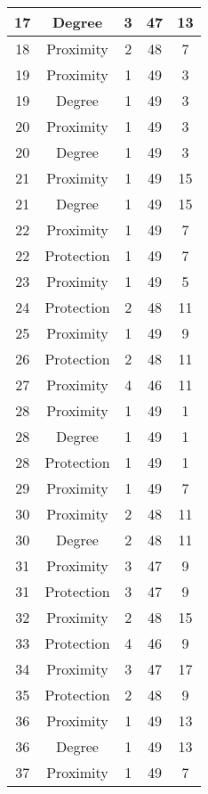 \documentclass[results.tex]{subfiles}
\begin{document}
\begin{center}
\begin{tabular}{| c || c | c | c | c |}
    17 & Degree & 3 & 47 & 13 \\ 
    \hline
    18 & Proximity & 2 & 48 & 7 \\ 
    \hline
    19 & Proximity & 1 & 49 & 3 \\ 
    \hline
    19 & Degree & 1 & 49 & 3 \\ 
    \hline
    20 & Proximity & 1 & 49 & 3 \\ 
    \hline
    20 & Degree & 1 & 49 & 3 \\ 
    \hline
    21 & Proximity & 1 & 49 & 15 \\ 
    \hline
    21 & Degree & 1 & 49 & 15 \\ 
    \hline
    22 & Proximity & 1 & 49 & 7 \\ 
    \hline
    22 & Protection & 1 & 49 & 7 \\ 
    \hline
    23 & Proximity & 1 & 49 & 5 \\ 
    \hline
    24 & Protection & 2 & 48 & 11 \\ 
    \hline
    25 & Proximity & 1 & 49 & 9 \\ 
    \hline
    26 & Protection & 2 & 48 & 11 \\ 
    \hline
    27 & Proximity & 4 & 46 & 11 \\ 
    \hline
    28 & Proximity & 1 & 49 & 1 \\ 
    \hline
    28 & Degree & 1 & 49 & 1 \\ 
    \hline
    28 & Protection & 1 & 49 & 1 \\ 
    \hline
    29 & Proximity & 1 & 49 & 7 \\ 
    \hline
    30 & Proximity & 2 & 48 & 11 \\ 
    \hline
    30 & Degree & 2 & 48 & 11 \\ 
    \hline
    31 & Proximity & 3 & 47 & 9 \\ 
    \hline
    31 & Protection & 3 & 47 & 9 \\ 
    \hline
    32 & Proximity & 2 & 48 & 15 \\ 
    \hline
    33 & Protection & 4 & 46 & 9 \\ 
    \hline
    34 & Proximity & 3 & 47 & 17 \\ 
    \hline
    35 & Protection & 2 & 48 & 9 \\ 
    \hline
    36 & Proximity & 1 & 49 & 13 \\ 
    \hline
    36 & Degree & 1 & 49 & 13 \\ 
    \hline
    37 & Proximity & 1 & 49 & 7 \\ 
    \hline

\end{tabular}
\end{center}
\end{document}
